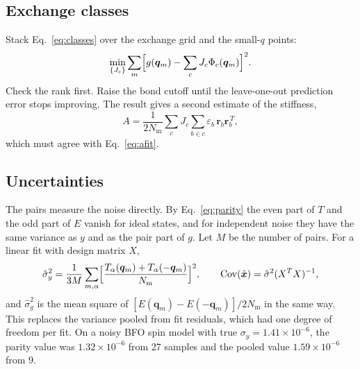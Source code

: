 \documentclass[11pt,a4paper]{article}
\numberwithin{equation}{section}
\newcommand{\vct}[1]{\bm{#1}}
\newcommand{\qh}{\vct q}
\newcommand{\Nm}{N_{\mathrm m}}
\begin{document}
\subsection{Exchange classes}

Stack Eq.~\eqref{eq:classes} over the exchange grid and the small-$q$ points:
\begin{equation}\label{eq:jfit}
 \min_{\{J_c\}}\sum_m\Bigl[g(\qh_m)-\sum_cJ_c\Phi_c(\qh_m)\Bigr]^2.
\end{equation}
Check the rank first. Raise the bond cutoff until the leave-one-out prediction
error stops improving. The result gives a second estimate of the stiffness,
\begin{equation}\label{eq:acheck}
 A=\frac{1}{2\Nm}\sum_cJ_c\sum_{b\in c}\varepsilon_b\,\vct r_b\vct r_b^{\,T},
\end{equation}
which must agree with Eq.~\eqref{eq:afit}.

\subsection{Uncertainties}

The pairs measure the noise directly. By Eq.~\eqref{eq:parity} the even part of
$T$ and the odd part of $E$ vanish for ideal states, and for independent noise
they have the same variance as $y$ and as the pair part of $g$. Let $M$ be the
number of pairs. For a linear fit with design matrix $X$,
\begin{equation}\label{eq:cov}
 \hat\sigma_y^2=\frac{1}{3M}\sum_{m,\alpha}
 \Bigl[\frac{T_\alpha(\qh_m)+T_\alpha(-\qh_m)}{\Nm}\Bigr]^2,\qquad
 \operatorname{Cov}(\hat{\vct x})=\hat\sigma^2(X^TX)^{-1},
\end{equation}
and $\hat\sigma_g^2$ is the mean square of $[E(\qh_m)-E(-\qh_m)]/2\Nm$ in the
same way. This replaces the variance pooled from fit residuals, which had one
degree of freedom per fit. On a noisy BFO spin model with true
$\sigma_y=1.41\times10^{-6}$, the parity value was $1.32\times10^{-6}$ from 27
samples and the pooled value $1.59\times10^{-6}$ from 9.
\end{document}

